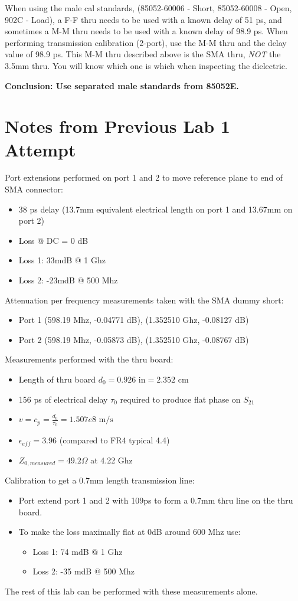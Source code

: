When using the male cal standards, (85052-60006 - Short, 85052-60008 - Open, 902C - Load), a F-F thru needs to be used with a known delay of 51 ps, and sometimes a M-M thru needs to be used with a known delay of 98.9 ps.
When performing transmission calibration (2-port), use the M-M thru and the delay value of 98.9 ps.
This M-M thru described above is the SMA thru, \emph{NOT} the 3.5mm thru. You will know which one is which when inspecting the dielectric.

\textbf{Conclusion: Use separated male standards from 85052E.}
\section{Notes from Previous Lab 1 Attempt}

Port extensions performed on port 1 and 2 to move reference plane to end of SMA connector:
\begin{itemize}
    \item 38 ps delay (13.7mm equivalent electrical length on port 1 and 13.67mm on port 2)
    \item Loss @ DC = 0 dB
    \item Loss 1: 33mdB @ 1 Ghz
    \item Loss 2: -23mdB @ 500 Mhz
\end{itemize}

Attenuation per frequency measurements taken with the SMA dummy short:
\begin{itemize}
    \item Port 1 (598.19 Mhz, -0.04771 dB), (1.352510 Ghz, -0.08127 dB)
    \item Port 2 (598.19 Mhz, -0.05873 dB), (1.352510 Ghz, -0.08767 dB)
\end{itemize}

Measurements performed with the thru board:
\begin{itemize}
    \item Length of thru board $d_0 = 0.926 \text{ in} = 2.352 \text{ cm}$
    \item 156 ps of electrical delay $\tau_0$ required to produce flat phase on $S_{21}$
    \item $v = c_p = \frac{d_0}{\tau_0} = 1.507e8 \text{ m/s}$
    \item $\epsilon_{eff} = 3.96$ (compared to FR4 typical 4.4)
    \item $Z_{0,measured} = 49.2 \Omega$ at 4.22 Ghz
\end{itemize}

Calibration to get a 0.7mm length transmission line:
\begin{itemize}
    \item Port extend port 1 and 2 with 109ps to form a 0.7mm thru line on the thru board.
    \item To make the loss maximally flat at 0dB around 600 Mhz use:
    \begin{itemize}
        \item Loss 1: 74 mdB @ 1 Ghz
        \item Loss 2: -35 mdB @ 500 Mhz
    \end{itemize}
\end{itemize}

The rest of this lab can be performed with these measurements alone.


